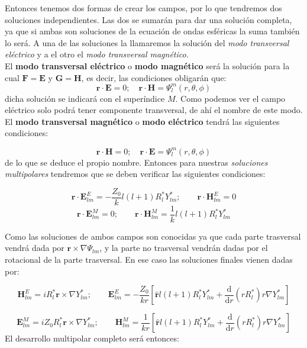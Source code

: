 \documentclass[12pt,a4paper]{article}
\newcommand{\ccorchetes}[1]{\left[ #1  \right]}
\newcommand{\derivadas}[2]{\frac{\D #1}{\D #2}}
\newcommand{\D}{\mathrm{d}}
\newcommand{\En}{\mathbf{E}}
\newcommand{\Hn}{\mathbf{H}}
\newcommand{\Fn}{\mathbf{F}}
\newcommand{\rn}{\mathbf{r}}
\newcommand{\Gn}{\mathbf{G}}
\numberwithin{equation}{section}
\numberwithin{figure}{section}
\begin{document}
Entonces tenemos dos formas de crear los campos, por lo que tendremos dos soluciones independientes. Las dos se sumarán para dar una solución completa, ya que si ambas son soluciones de la ecuación de ondas esféricas la suma también lo será. A una de las soluciones la llamaremos la solución del \textit{modo transversal eléctrico} y a el otro el \textit{modo transversal magnético}. \\


El \textbf{modo transversal eléctrico} o \textbf{modo magnético} será la solución para la cual $\Fn = \En$ y $\Gn = \Hn$, es decir, las condiciones obligarán que: $$ \rn \cdot \En = 0; \quad \rn \cdot \Hn = \Psi_l^m (r, \theta, \phi)  $$ dicha solución se indicará con el superíndice $M$. Como podemos ver el campo eléctrico solo podrá tener componente transversal, de ahí el nombre de este modo. El \textbf{modo transversal magnético} o \textbf{modo eléctrico} tendrá las siguientes condiciones:

$$ \rn \cdot \Hn = 0; \quad \rn \cdot \En = \Psi_l^m (r, \theta, \phi)  $$
de lo que se deduce el propio nombre. Entonces para nuestras \textit{soluciones multipolares} tendremos que se deben verificar las siguientes condiciones:

\begin{equation}
\rn \cdot \En_{lm}^E = - \dfrac{Z_0}{k} l (l+1) R_l^* Y_{lm}^*; \quad \quad \rn \cdot \Hn_{lm}^E = 0 
\end{equation}
\begin{equation}
\rn \cdot \En_{lm}^M = 0; \quad \quad \rn \cdot \Hn_{lm}^M =  \dfrac{1}{k} l (l+1) R_l^* Y_{lm}^*
\end{equation}

Como las soluciones de ambos campos son conocidas ya que cada parte trasversal vendrá dada por $\rn \times \nabla \Psi_{lm}$, y la parte no trasversal vendrán dadas por el rotacional de la parte trasversal. En ese caso las soluciones finales vienen dadas por:

\begin{equation}
\Hn_{lm}^E = i R_l^* \rn \times \nabla Y_{lm}^*; \quad \quad \En_{lm}^E = - \dfrac{Z_0}{kr} \ccorchetes{\hat{\rn} l (l+1) R_l^* Y_{lm}^* + \derivadas{}{r} (rR_l^*) r \nabla Y_{lm}^*}
\end{equation}

\begin{equation}
\En_{lm}^M = i  Z_0 R_l^* \rn \times \nabla Y_{lm}^*; \quad \quad \Hn_{lm}^M = \dfrac{1}{kr} \ccorchetes{\hat{\rn} l (l+1) R_l^* Y_{lm}^* + \derivadas{}{r} (rR_l^*) r \nabla Y_{lm}^*}
\end{equation}
El desarrollo multipolar completo será entonces:
\end{document}
